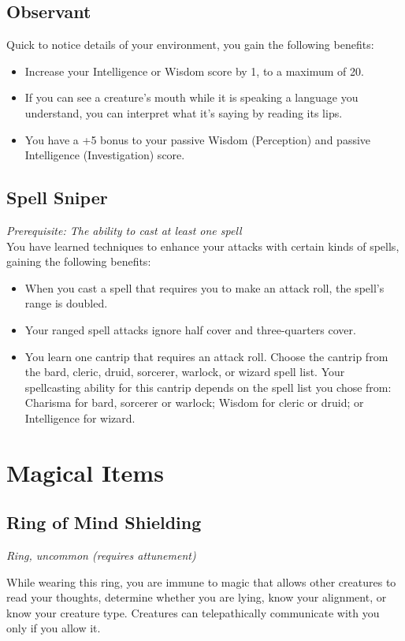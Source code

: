 \documentclass[a4paper,openany,twocolumn]{book}
\begin{document}
\subsection*{Observant}
Quick to notice details of your environment, you gain the following benefits:
\begin{itemize}
  \item Increase your Intelligence or Wisdom score by 1, to a maximum of 20.
  \item If you can see a creature's mouth while it is speaking a language you understand, you can interpret what it's saying by reading its lips.
  \item You have a +5 bonus to your passive Wisdom (Perception) and passive Intelligence (Investigation) score.
\end{itemize}

\subsection*{Spell Sniper}
\textit{Prerequisite: The ability to cast at least one spell}\\
You have learned techniques to enhance your attacks with certain kinds of spells, gaining the following benefits:
\begin{itemize}
  \item When you cast a spell that requires you to make an attack roll, the spell's range is doubled.
  \item Your ranged spell attacks ignore half cover and three-quarters cover.
  \item You learn one cantrip that requires an attack roll. Choose the cantrip from the bard, cleric, druid, sorcerer, warlock, or wizard spell list. Your spellcasting ability for this cantrip depends on the spell list you chose from: Charisma for bard, sorcerer or warlock; Wisdom for cleric or druid; or Intelligence for wizard.
\end{itemize}

\section*{Magical Items}
\subsection*{Ring of Mind Shielding}
\textit{Ring, uncommon (requires attunement)}

While wearing this ring, you are immune to magic that allows other creatures to read your thoughts, determine whether you are lying, know your alignment, or know your creature type. Creatures can telepathically communicate with you only if you allow it.
\end{document}
